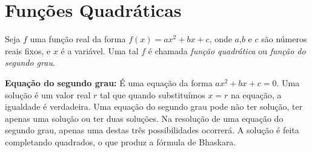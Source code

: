 \section{Funções Quadráticas}

Seja $f$ uma função real  da forma $f(x)=ax^2+bx+c$, onde $a$,$b$ e $c$ são números reais fixos, e $x$ é a variável. Uma tal $f$ é chamada \textit{função quadrática} ou
\textit{função do segundo grau}.


\noindent\textbf{Equação do segundo grau:} É uma equação da forma $ax^2+bx+c=0$. Uma solução é um valor real $r$ tal que quando substituímos $x=r$ na equação, a igualdade é verdadeira. Uma equação
do segundo grau pode não ter solução, ter apenas uma solução ou ter duas soluções. Na resolução de uma equação do segundo grau, apenas uma destas três possibilidades ocorrerá. A solução é feita completando quadrados,
o que produz a fórmula de Bhaskara.




